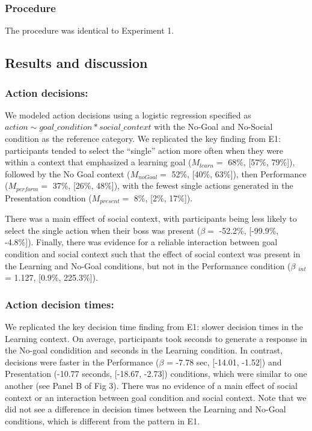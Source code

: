 \documentclass[10pt, letterpaper]{article}
\begin{document}
\subsubsection{Procedure}\label{procedure-1}

The procedure was identical to Experiment 1.

\subsection{Results and discussion}\label{results-and-discussion-1}

\subsubsection{Action decisions:}\label{action-decisions-1}

We modeled action decisions using a logistic regression specified as
\texttt{$action \sim goal\_condition * social\_context$} with the
No-Goal and No-Social condition as the reference category. We replicated
the key finding from E1: participants tended to select the ``single''
action more often when they were within a context that emphasized a
learning goal (\(M_{learn} =\) 68\%, {[}57\%, 79\%{]}), followed by the
No Goal context (\(M_{noGoal} =\) 52\%, {[}40\%, 63\%{]}), then
Performance (\(M_{perform} =\) 37\%, {[}26\%, 48\%{]}), with the fewest
single actions generated in the Presentation condtion (\(M_{present} =\)
8\%, {[}2\%, 17\%{]}).

There was a main efffect of social context, with participants being less
likely to select the single action when their boss was present
(\(\beta =\) -52.2\%, {[}-99.9\%, -4.8\%{]}). Finally, there was
evidence for a reliable interaction between goal condition and social
context such that the effect of social context was present in the
Learning and No-Goal conditions, but not in the Performance condition
(\(\beta\) \(_{int}\) = 1.127, {[}0.9\%, 225.3\%{]}).

\subsubsection{Action decision times:}\label{action-decision-times-1}

We replicated the key decision time finding from E1: slower decision
times in the Learning context. On average, participants took seconds to
generate a response in the No-goal condidition and seconds in the
Learning condition. In contrast, decisions were faster in the
Performance (\(\beta\) = -7.78 sec, {[}-14.01, -1.52{]}) and
Presentation (-10.77 seconds, {[}-18.67, -2.73{]}) conditions, which
were similar to one another (see Panel B of Fig 3). There was no
evidence of a main effect of social context or an interaction between
goal condition and social context. Note that we did not see a difference
in decision times between the Learning and No-Goal conditions, which is
different from the pattern in E1.
\end{document}
